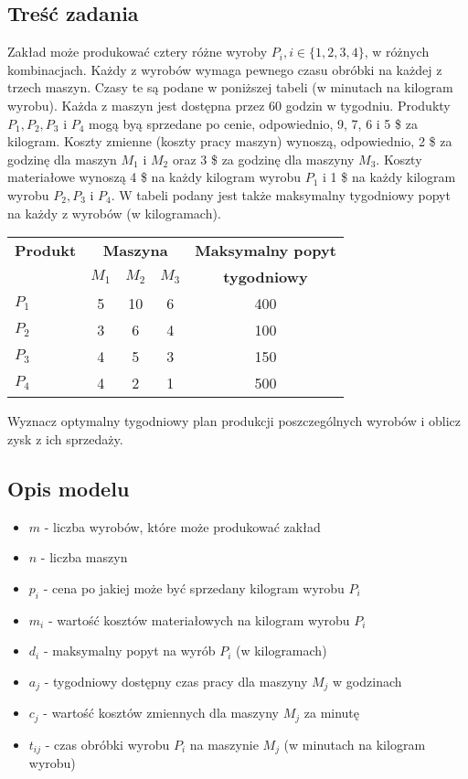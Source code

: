 \documentclass{article}
\begin{document}
\subsection{Treść zadania}
Zakład może produkować cztery różne wyroby $P_i, i \in \{1, 2, 3, 4\}$, w różnych kombinacjach. Każdy z wyrobów wymaga pewnego czasu obróbki na każdej z trzech maszyn. Czasy te są podane w poniższej tabeli (w minutach na kilogram wyrobu). Każda z maszyn jest dostępna przez 60 godzin w tygodniu. Produkty $P_1, P_2, P_3$ i $P_4$ mogą byą sprzedane po cenie, odpowiednio, 9, 7, 6 i 5 \$ za kilogram. Koszty zmienne (koszty pracy maszyn) wynoszą, odpowiednio, 2 \$ za godzinę dla maszyn $M_1$ i $M_2$ oraz 3 \$ za godzinę dla maszyny $M_3$. Koszty materiałowe wynoszą 4 \$ na każdy kilogram wyrobu $P_1$ i 1 \$ na każdy kilogram wyrobu $P_2, P_3$ i $P_4$. W tabeli podany jest także maksymalny tygodniowy popyt na każdy
z wyrobów (w kilogramach).
\begin{table}[H]
\centering
\begin{tabular}{l|c|c|c|c}
    \toprule
    \textbf{Produkt} & \multicolumn{3}{c}{\textbf{Maszyna}} & \textbf{Maksymalny popyt} \\
    & $M_1$ & $M_2$ & $M_3$ & \textbf{tygodniowy} \\
    \midrule
    $P_1$ & 5 & 10 & 6 & 400 \\
    $P_2$ & 3 & 6 & 4 & 100 \\
    $P_3$ & 4 & 5 & 3 & 150 \\
    $P_4$ & 4 & 2 & 1 & 500 \\
    \bottomrule
\end{tabular}
\end{table}
Wyznacz optymalny tygodniowy plan produkcji poszczególnych wyrobów i oblicz zysk z ich sprzedaży.
\subsection{Opis modelu}
\begin{itemize}
    \item $m$ - liczba wyrobów, które może produkować zakład
    \item $n$ - liczba maszyn
    \item $p_i$ - cena po jakiej może być sprzedany kilogram wyrobu $P_i$
    \item $m_i$ - wartość kosztów materiałowych na kilogram wyrobu $P_i$
    \item $d_i$ - maksymalny popyt na wyrób $P_i$ (w kilogramach)
    \item $a_j$ - tygodniowy dostępny czas pracy dla maszyny $M_j$ w godzinach
    \item $c_j$ - wartość kosztów zmiennych dla maszyny $M_j$ za minutę
    \item $t_{ij}$ - czas obróbki wyrobu $P_i$ na maszynie $M_j$ (w minutach na kilogram wyrobu)
\end{itemize}
\end{document}
